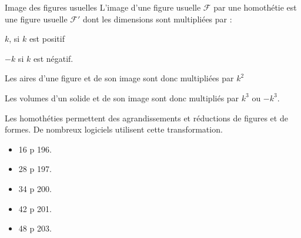 \documentclass[openany]{book}
\begin{document}




\begin{ThT}{Image des figures usuelles}
L'image d'une figure usuelle $\mathscr{F}$ par une homothétie est une figure usuelle $\mathscr{F'}$ dont les dimensions sont multipliées par :
\begin{description}
\item  $k$, si $k$ est positif 
\item  $-k$ si $k$ est négatif.
\end{description}
\end{ThT}

\begin{Rq}
\begin{description}[leftmargin=*]
\item  Les aires d'une figure et de son image sont donc multipliées par $k^2$ 
\item  Les volumes d'un solide et de son image sont donc multipliés par $k^3$ ou $-k^3$.
\item  Les homothéties permettent des agrandissements et réductions de figures et de formes. De nombreux logiciels utilisent cette transformation.
\end{description}
\end{Rq}



\begin{itemize}
\item 16 p 196.
\item 28 p 197.
\item 34 p 200.
\item 42 p 201. 
\item 48 p 203.
\end{itemize}






%
%
%
%
%
%
%
%
%
%
\end{document}
